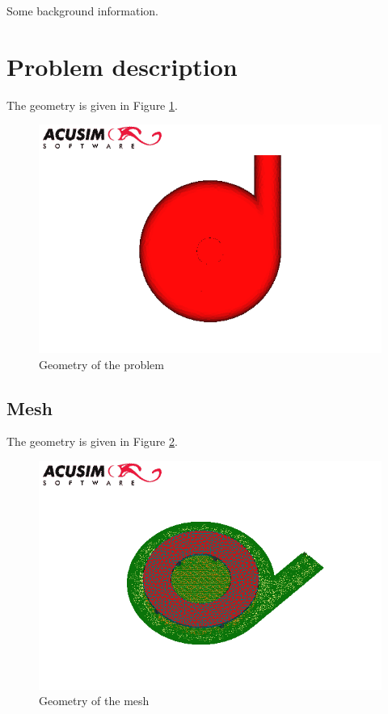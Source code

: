 \documentclass[letterpaper,12pt]{article}
\begin{document}
Some background information.
\\
\vfill
\newpage
\clearpage
\section{Problem description}

The geometry is given in Figure \ref{fig:geom}.
\\
\begin{figure}[!h!tbp]
\begin{center}
\includegraphics[scale=0.751879699248]{./Figures/Image_0.png}
\caption{\label{fig:geom}Geometry of the problem}
\end{center}
\end{figure}
\vfill
\newpage
\clearpage
\subsection{Mesh}

The geometry is given in Figure \ref{fig:mesh}.
\\
\begin{figure}[!h!tbp]
\begin{center}
\includegraphics[scale=0.751879699248]{./Figures/Image_1.png}
\caption{\label{fig:mesh}Geometry of the mesh}
\end{center}
\end{figure}
\vfill
\newpage
\clearpage
\end{document}
